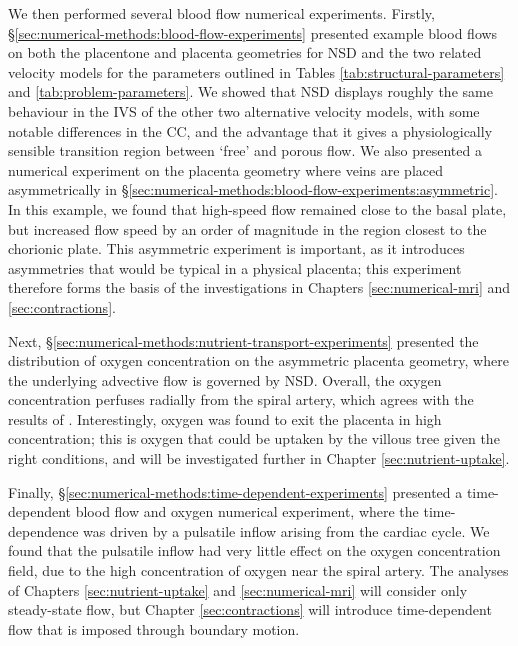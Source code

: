         We then performed several blood flow numerical experiments. Firstly, \S\ref{sec:numerical-methods:blood-flow-experiments} presented example blood flows on both the placentone and placenta geometries for NSD and the two related velocity models for the parameters outlined in Tables \ref{tab:structural-parameters} and \ref{tab:problem-parameters}. We showed that NSD displays roughly the same behaviour in the IVS of the other two alternative velocity models, with some notable differences in the CC, and the advantage that it gives a physiologically sensible transition region between `free' and porous flow. We also presented a numerical experiment on the placenta geometry where veins are placed asymmetrically in \S\ref{sec:numerical-methods:blood-flow-experiments:asymmetric}. In this example, we found that high-speed flow remained close to the basal plate, but increased flow speed by an order of magnitude in the region closest to the chorionic plate. This asymmetric experiment is important, as it introduces asymmetries that would be typical in a physical placenta; this experiment therefore forms the basis of the investigations in Chapters \ref{sec:numerical-mri} and \ref{sec:contractions}.
        
        Next, \S\ref{sec:numerical-methods:nutrient-transport-experiments} presented the distribution of oxygen concentration on the asymmetric placenta geometry, where the underlying advective flow is governed by NSD. Overall, the oxygen concentration perfuses radially from the spiral artery, which agrees with the results of \citeauthor{chernyavskyMathematicalModelIntervillous2010} \cite{chernyavskyMathematicalModelIntervillous2010}. Interestingly, oxygen was found to exit the placenta in high concentration; this is oxygen that could be uptaken by the villous tree given the right conditions, and will be investigated further in Chapter \ref{sec:nutrient-uptake}.
        
        Finally, \S\ref{sec:numerical-methods:time-dependent-experiments} presented a time-dependent blood flow and oxygen numerical experiment, where the time-dependence was driven by a pulsatile inflow arising from the cardiac cycle. We found that the pulsatile inflow had very little effect on the oxygen concentration field, due to the high concentration of oxygen near the spiral artery. The analyses of Chapters \ref{sec:nutrient-uptake} and \ref{sec:numerical-mri} will consider only steady-state flow, but Chapter \ref{sec:contractions} will introduce time-dependent flow that is imposed through boundary motion.

